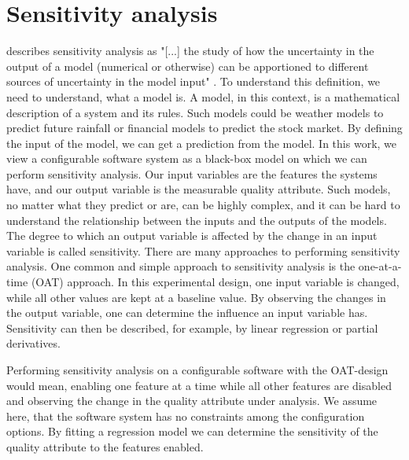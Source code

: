 \documentclass[../../thesis.tex]{subfiles}
\begin{document}
\section{Sensitivity analysis}
\citeauthor{saltelli2004global} describes sensitivity analysis as 
"[...] the study of how the uncertainty in the output of a model
(numerical or otherwise) can be apportioned to different sources of uncertainty in the model input" \cite{saltelli2004global}.
To understand this definition, we need to understand, what a model is. A model, in this context, is a mathematical
description of a system and its rules. Such models could be weather models to predict future rainfall or financial models
to predict the stock market. By defining the input of the model, we can get a prediction from the model.
In this work, we view a configurable software system as a black-box model on which we can
perform sensitivity analysis. Our input variables are the features the systems have, and our output variable is the
measurable quality attribute.
Such models, no matter what they predict or are, can be highly complex, and it can be hard to understand the relationship
between the inputs and the outputs of the models.
The degree to which an output variable is affected by the change in an input variable is called sensitivity.
There are many approaches to performing sensitivity analysis.
One common and simple approach to sensitivity analysis is the one-at-a-time (OAT) approach.
In this experimental design, one input variable is changed, while all other values are kept at a baseline value.
By observing the changes in the output variable, one can determine the influence an input variable has.
Sensitivity can then be described, for example, by linear regression or partial derivatives.

Performing sensitivity analysis on a configurable software with the OAT-design would mean,
enabling one feature at a time while all other features are disabled and observing the change in the quality attribute under analysis.
We assume here, that the software system has no constraints among the configuration options.
By fitting a regression model we can determine the sensitivity of the quality attribute to the features enabled.
\end{document}
